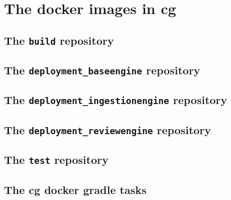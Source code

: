 	\section{The docker images in cg}
		\subsection{The \texttt{build} repository}
		\subsection{The \texttt{deployment\_baseengine} repository}
		\subsection{The \texttt{deployment\_ingestionengine} repository}
		\subsection{The \texttt{deployment\_reviewengine} repository}
		\subsection{The \texttt{test} repository}
		\subsection{The cg docker gradle tasks}